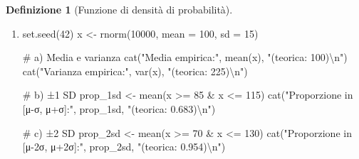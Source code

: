 \documentclass[
  italian,
  letterpaper,
  a4paper,
  11pt,
  open=any]{scrbook}
\newenvironment{Shaded}{\begin{snugshade}}{\end{snugshade}}
\newcommand{\AttributeTok}[1]{\textcolor[rgb]{0.40,0.45,0.13}{#1}}
\newcommand{\CommentTok}[1]{\textcolor[rgb]{0.37,0.37,0.37}{#1}}
\newcommand{\DecValTok}[1]{\textcolor[rgb]{0.68,0.00,0.00}{#1}}
\newcommand{\FunctionTok}[1]{\textcolor[rgb]{0.28,0.35,0.67}{#1}}
\newcommand{\NormalTok}[1]{\textcolor[rgb]{0.00,0.23,0.31}{#1}}
\newcommand{\OtherTok}[1]{\textcolor[rgb]{0.00,0.23,0.31}{#1}}
\newcommand{\SpecialCharTok}[1]{\textcolor[rgb]{0.37,0.37,0.37}{#1}}
\newcommand{\StringTok}[1]{\textcolor[rgb]{0.13,0.47,0.30}{#1}}
\theoremstyle{plain}
\theoremstyle{definition}
\theoremstyle{definition}
\newtheorem{definition}{Definizione}[chapter]
\theoremstyle{remark}
\begin{document}
\begin{definition}[Funzione di densità di
probabilità]
\begin{tcolorbox}
\begin{enumerate}
\begin{Shaded}
\begin{Highlighting}[]
\NormalTok{  gridExtra}\SpecialCharTok{::}\FunctionTok{grid.arrange}\NormalTok{(p1, p2, }\AttributeTok{ncol =} \DecValTok{2}\NormalTok{)}
\NormalTok{\}}
\end{Highlighting}
\end{Shaded}
\item
\begin{Shaded}
\begin{Highlighting}[]
\FunctionTok{set.seed}\NormalTok{(}\DecValTok{42}\NormalTok{)}
\NormalTok{x }\OtherTok{\textless{}{-}} \FunctionTok{rnorm}\NormalTok{(}\DecValTok{10000}\NormalTok{, }\AttributeTok{mean =} \DecValTok{100}\NormalTok{, }\AttributeTok{sd =} \DecValTok{15}\NormalTok{)}

\CommentTok{\# a) Media e varianza}
\FunctionTok{cat}\NormalTok{(}\StringTok{"Media empirica:"}\NormalTok{, }\FunctionTok{mean}\NormalTok{(x), }\StringTok{"(teorica: 100)}\SpecialCharTok{\textbackslash{}n}\StringTok{"}\NormalTok{)}
\FunctionTok{cat}\NormalTok{(}\StringTok{"Varianza empirica:"}\NormalTok{, }\FunctionTok{var}\NormalTok{(x), }\StringTok{"(teorica: 225)}\SpecialCharTok{\textbackslash{}n}\StringTok{"}\NormalTok{)}

\CommentTok{\# b) ±1 SD}
\NormalTok{prop\_1sd }\OtherTok{\textless{}{-}} \FunctionTok{mean}\NormalTok{(x }\SpecialCharTok{\textgreater{}=} \DecValTok{85} \SpecialCharTok{\&}\NormalTok{ x }\SpecialCharTok{\textless{}=} \DecValTok{115}\NormalTok{)}
\FunctionTok{cat}\NormalTok{(}\StringTok{"Proporzione in [μ{-}σ, μ+σ]:"}\NormalTok{, prop\_1sd, }\StringTok{"(teorica: 0.683)}\SpecialCharTok{\textbackslash{}n}\StringTok{"}\NormalTok{)}

\CommentTok{\# c) ±2 SD}
\NormalTok{prop\_2sd }\OtherTok{\textless{}{-}} \FunctionTok{mean}\NormalTok{(x }\SpecialCharTok{\textgreater{}=} \DecValTok{70} \SpecialCharTok{\&}\NormalTok{ x }\SpecialCharTok{\textless{}=} \DecValTok{130}\NormalTok{)}
\FunctionTok{cat}\NormalTok{(}\StringTok{"Proporzione in [μ{-}2σ, μ+2σ]:"}\NormalTok{, prop\_2sd, }\StringTok{"(teorica: 0.954)}\SpecialCharTok{\textbackslash{}n}\StringTok{"}\NormalTok{)}
\end{Highlighting}
\end{Shaded}
\end{enumerate}

\end{tcolorbox}

\begin{tcolorbox}[enhanced jigsaw, arc=.35mm, bottomrule=.15mm, bottomtitle=1mm, breakable, colback=white, colbacktitle=quarto-callout-note-color!10!white, colframe=quarto-callout-note-color-frame, coltitle=black, left=2mm, leftrule=.75mm, opacityback=0, opacitybacktitle=0.6, rightrule=.15mm, title=\textcolor{quarto-callout-note-color}{\faInfo}\hspace{0.5em}{Informazioni sull'ambiente di sviluppo}, titlerule=0mm, toprule=.15mm, toptitle=1mm]


\end{tcolorbox}
\end{definition}
\end{document}
